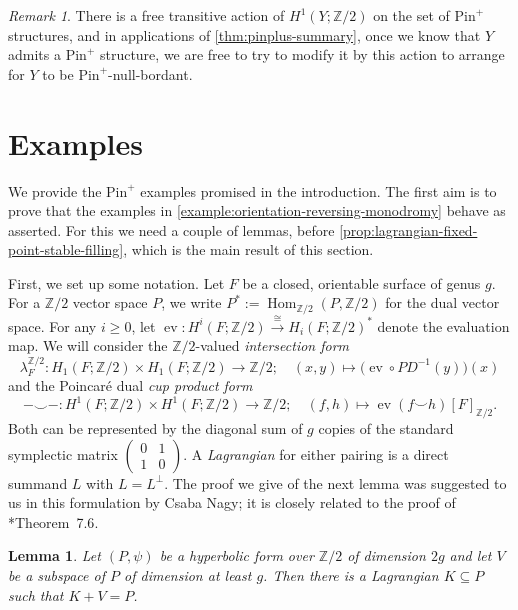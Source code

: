 \documentclass[a4paper, reqno]{amsart}
\newtheorem{lemma}[proposition]{Lemma}
\theoremstyle{definition}
\theoremstyle{remark}
\newtheorem{remark}[proposition]{Remark}
\newcommand{\Z}{\mathbb{Z}}
\newcommand{\pinplus}{{\mathrm{Pin}^+}\!}
\DeclareMathOperator{\Hom}{Hom}
\DeclareMathOperator{\ev}{ev}
\newcommand{\bsm}{\left(\begin{smallmatrix}}
\newcommand{\esm}{\end{smallmatrix}\right)}
\begin{document}
\begin{remark}
    There is a free transitive action of $H^1(Y;\Z/2)$ on the set of $\pinplus$ structures, and in applications of \cref{thm:pinplus-summary},  once we know that $Y$ admits a $\pinplus$ structure, we are free to try to modify it by this action to arrange for $Y$ to be $\pinplus$-null-bordant. 
\end{remark}

\section{Examples}\label{sec:examples}

We provide the $\pinplus$ examples promised in the introduction. 
The first aim is to prove that the examples in \cref{example:orientation-reversing-monodromy} behave as asserted. 
For this we need a couple of lemmas, before \cref{prop:lagrangian-fixed-point-stable-filling}, which is the main result of this section. 

First, we set up some notation. 
Let $F$ be a closed, orientable surface of genus $g$. 
For a $\Z/2$ vector space $P$, we write $P^* := \Hom_{\Z/2}(P,\Z/2)$ for the dual vector space. 
For any $i \geq 0$, let $\ev \colon H^i(F;\Z/2) \xrightarrow{\cong} H_i(F;\Z/2)^*$ denote the evaluation map. 
We will consider the $\Z/2$-valued \emph{intersection form}
\[\lambda_F^{\Z/2} \colon H_1(F;\Z/2) \times H_1(F;\Z/2) \to \Z/2; \quad (x,y) \mapsto \big(\ev \circ PD^{-1}(y)\big) (x)\] 
and the Poincar\'{e} dual \emph{cup product form}
\[- \smile - \colon H^1(F;\Z/2) \times H^1(F;\Z/2) \to \Z/2; \quad (f,h) \mapsto \ev(f \smile h) [F]_{\Z/2}.\]
Both can be represented by the diagonal sum of $g$ copies of the standard symplectic matrix $\bsm 0 & 1 \\  1 & 0  \esm$. 
A \emph{Lagrangian} for either pairing is a direct summand $L$ with $L = L^{\perp}$. The proof we give of the next lemma was suggested to us in this formulation by Csaba Nagy; it is closely related to the proof of \cite{Nagy-2024}*{Theorem~7.6}. 

\begin{lemma}\label{lemma:lagrangian-complement}
    Let $(P,\psi)$ be a hyperbolic form over $\Z/2$ of dimension $2g$ and let $V$ be a subspace of $P$ of dimension at least $g$. Then there is a Lagrangian $K \subseteq P$ such that $K +V = P$. 
\end{lemma}
\end{document}
